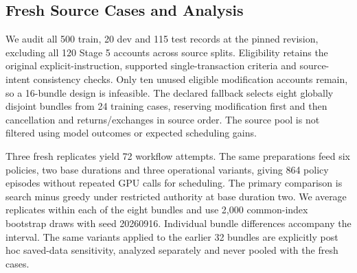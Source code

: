 \subsection{Fresh Source Cases and Analysis}
We audit all 500 train, 20 dev and 115 test records at the pinned revision, excluding all 120 Stage 5 accounts across source splits. Eligibility retains the original explicit-instruction, supported single-transaction criteria and source-intent consistency checks. Only ten unused eligible modification accounts remain, so a 16-bundle design is infeasible. The declared fallback selects eight globally disjoint bundles from 24 training cases, reserving modification first and then cancellation and returns/exchanges in source order. The source pool is not filtered using model outcomes or expected scheduling gains.

Three fresh replicates yield 72 workflow attempts. The same preparations feed six policies, two base durations and three operational variants, giving 864 policy episodes without repeated GPU calls for scheduling. The primary comparison is search minus greedy under restricted authority at base duration two. We average replicates within each of the eight bundles and use 2,000 common-index bootstrap draws with seed 20260916. Individual bundle differences accompany the interval. The same variants applied to the earlier 32 bundles are explicitly post hoc saved-data sensitivity, analyzed separately and never pooled with the fresh cases.



